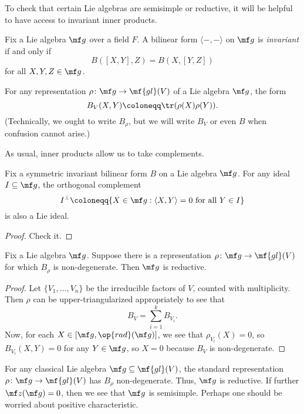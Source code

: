 \documentclass[../notes.tex]{subfiles}
\begin{document}
To check that certain Lie algebras are semisimple or reductive, it will be helpful to have access to invariant inner products.
\begin{definition}[invariant]
	Fix a Lie algebra $\mf g$ over a field $F$. A bilinear form $\langle-,-\rangle$ on $\mf g$ is \textit{invariant} if and only if
	\[B([X,Y],Z)=B(X,[Y,Z])\]
	for all $X,Y,Z\in\mf g$.
\end{definition}
\begin{example}
	For any representation $\rho\colon\mf g\to\mf{gl}(V)$ of a Lie algebra $\mf g$, the form
	\[B_V(X,Y)\coloneqq\tr(\rho(X)\rho(Y)).\]
	(Technically, we ought to write $B_\rho$, but we will write $B_V$ or even $B$ when confusion cannot arise.)
\end{example}
As usual, inner products allow us to take complements.
\begin{proposition}
	Fix a symmetric invariant bilinear form $B$ on a Lie algebra $\mf g$. For any ideal $I\subseteq\mf g$, the orthogonal complement
	\[I^\perp\coloneqq\{X\in\mf g:\langle X,Y\rangle=0\text{ for all }Y\in I\}\]
	is also a Lie ideal.
\end{proposition}
\begin{proof}
	Check it.
\end{proof}
\begin{proposition}
	Fix a Lie algebra $\mf g$. Suppose there is a representation $\rho\colon\mf g\to\mf{gl}(V)$ for which $B_\rho$ is non-degenerate. Then $\mf g$ is reductive.
\end{proposition}
\begin{proof}
	Let $\{V_1,\ldots,V_n\}$ be the irreducible factors of $V$, counted with multiplicity. Then $\rho$ can be upper-triangularized appropriately to see that
	\[B_V=\sum_{i=1}^kB_{V_i}.\]
	Now, for each $X\in[\mf g,\op{rad}(\mf g)]$, we see that $\rho_{V_i}(X)=0$, so $B_{V_i}(X,Y)=0$ for any $Y\in\mf g$, so $X=0$ because $B_V$ is non-degenerate.
\end{proof}
\begin{example}
	For any classical Lie algebra $\mf g\subseteq\mf{gl}(V)$, the standard representation $\rho\colon\mf g\to\mf{gl}(V)$ has $B_\rho$ non-degenerate. Thus, $\mf g$ is reductive. If further $\mf z(\mf g)=0$, then we see that $\mf g$ is semisimple. Perhaps one should be worried about positive characteristic.
\end{example}
\end{document}
